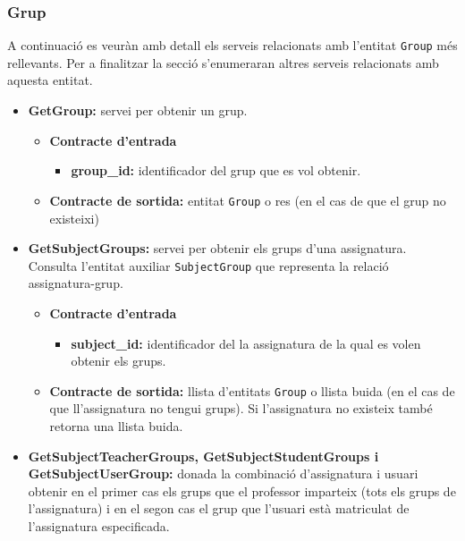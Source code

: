 		
		\subsubsection{Grup}
		A continuació es veuràn amb detall els serveis relacionats amb l'entitat \texttt{Group} més rellevants. Per a finalitzar la secció s'enumeraran altres serveis relacionats amb aquesta entitat.
		
		\begin{itemize}
			\item \textbf{GetGroup:} servei per obtenir un grup.
			
				\begin{itemize}
					\item \textbf{Contracte d'entrada}
						\begin{itemize}
							\item \textbf{group\_id:} identificador del grup que es vol obtenir.
						\end{itemize}
					\item \textbf{Contracte de sortida:} entitat \texttt{Group} o res (en el cas de que el grup no existeixi)
				\end{itemize}
			\item \textbf{GetSubjectGroups:} servei per obtenir els grups d'una assignatura. Consulta l'entitat auxiliar \texttt{SubjectGroup} que representa la relació assignatura-grup.
				\begin{itemize}
					\item \textbf{Contracte d'entrada}
						\begin{itemize}
							\item \textbf{subject\_id:} identificador del la assignatura de la qual es volen obtenir els grups.
						\end{itemize}
					\item \textbf{Contracte de sortida:} llista d'entitats \texttt{Group} o llista buida (en el cas de que ll'assignatura no tengui grups). Si l'assignatura no existeix també retorna una llista buida.
				\end{itemize}
			
			
			\item \textbf{GetSubjectTeacherGroups, GetSubjectStudentGroups i GetSubjectUserGroup:} donada la combinació d'assignatura i usuari obtenir en el primer cas els grups que el professor imparteix (tots els grups de l'assignatura) i en el segon cas el grup que l'usuari està matriculat de l'assignatura especificada.\\
			

\end{itemize}
